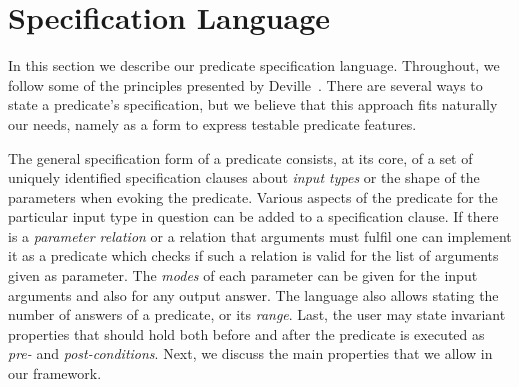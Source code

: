 
\section{Specification Language}
\label{sec:pred-spec}

In this section we describe our predicate specification language.
%
Throughout, we follow some of the principles presented
by Deville~\cite{Deville1990logprog}.
%
There are several ways to state a predicate's specification, %
but we
 believe that this approach fits naturally our needs, namely as a
form to express testable predicate features. %


The general specification form of a predicate  consists, at its
core, of a set of uniquely identified specification clauses
 about \emph{input types} or the shape of the parameters when evoking the predicate.
%
%
Various aspects of the predicate for the particular input type in
question can be added to a specification clause.
%
If there is
a \emph{parameter relation} or
 a relation that arguments must fulfil one can implement it
as a predicate %
which checks if such a relation is
valid for the list of arguments given as parameter.
%
The \emph{modes} of each parameter can be given for the input arguments and also
for any output answer.
%
The language also allows stating the number of
answers of a predicate,
or its \emph{range}.
%
Last, the user may state invariant properties that should hold both
before and after the predicate is executed as \emph{pre-} and \emph{post-conditions}.
%
Next, we discuss the main properties that we allow in our framework.

